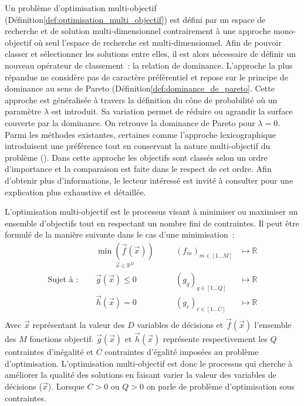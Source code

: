 Un problème d’optimisation multi-objectif (Définition\ref{def:optimisation_multi_objectif})
est défini par un espace de recherche et de solution multi-dimensionnel contrairement à
une approche mono-objectif où seul l’espace de recherche est multi-dimensionnel.
Afin de pouvoir classer et sélectionner les solutions entre elles, il est alors nécessaire
de définir un nouveau opérateur de classement~: la relation de dominance.
L’approche la plus répandue ne considère pas de caractère préférentiel et repose sur
le principe de dominance au sens de Pareto (Définition\ref{def:dominance_de_pareto}.
Cette approche est généralisée à travers la définition du cône de probabilité où
un paramètre $\lambda$ est introduit. Sa variation permet de réduire ou agrandir
la surface couverte par la dominance. On retrouve la dominance de Pareto pour $\lambda = 0$.
Parmi les méthodes existantes, certaines comme l’approche lexicographique introduisent une
préférence tout en conservant la nature multi-objectif du problème (). Dans cette approche les objectifs sont classés selon un ordre d’importance et
la comparaison est faite dans le respect de cet ordre.
Afin d’obtenir plus d’informations, le lecteur intéressé est invité à consulter \cite{Collette2002}
pour une explication plus exhaustive et détaillée.

\begin{Def}\label{def:optimisation_multi_objectif}
L’optimisation multi-objectif est le processus visant à minimiser ou maximiser un ensemble
d’objectifs tout en respectant un nombre fini de contraintes.
Il peut être formulé de la manière suivante dans le cas d’une minimisation~:
\begin{equation}\label{eq:def_optimisation}
  \begin{aligned}
                           & \underset{\vec{x} \in \mathbb{R}^{D}}{\min(\vec{f}(\vec{x}))}&
                           & \quad (f_{m})_{m \in [1 ... M]} & \longmapsto \mathbb{R} \\
    \text{Sujet à~: }\quad & \vec{g}(\vec{x}) \leqslant 0                                 &
                           & \quad (g_{q})_{q \in [1 ... Q]} & \longmapsto \mathbb{R} \\
                           & \vec{h}(\vec{x}) = 0                                         &
                           & \quad (g_{c})_{c \in [1 ... C]} & \longmapsto \mathbb{R} \\
  \end{aligned}
\end{equation}
Avec $\vec{x}$ représentant la valeur des $D$ variables de décisions et
$\vec{f}(\vec{x})$ l’ensemble des $M$ fonctions objectif.  $\vec{g}(\vec{x})$ et
$\vec{h}(\vec{x})$ représente respectivement les $Q$ contraintes d’inégalité et
$C$ contraintes d’égalité imposées au problème d’optimisation. L’optimisation
multi-objectif est donc le processus qui cherche à améliorer la qualité des
solutions en faisant varier la valeur des variables de décisions ($\vec{x}$).
Lorsque $C > 0$ ou $Q > 0$ on parle de problème d’optimisation sous contraintes.
\end{Def}

